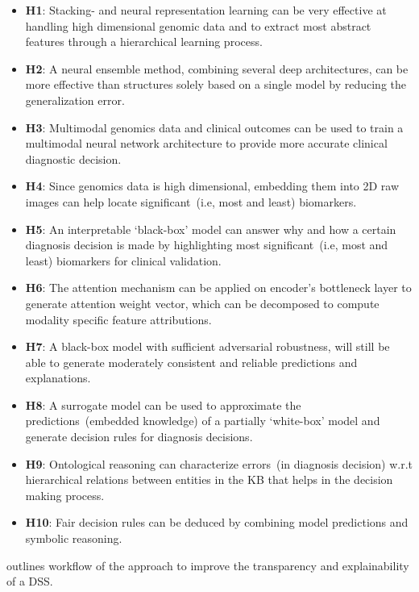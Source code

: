 \begin{itemize}[noitemsep]
    \item \textbf{H1}: Stacking- and neural representation learning can be very effective at handling high dimensional genomic data and to extract most abstract features through a hierarchical learning process. 
    \item \textbf{H2}: A neural ensemble method, combining several deep architectures, can be more effective than structures solely based on a single model by reducing the generalization error. 
	\item \textbf{H3}: Multimodal genomics data and clinical outcomes can be used to train a multimodal neural network architecture to provide more accurate clinical diagnostic decision. 
    \item \textbf{H4}: Since genomics data is high dimensional, embedding them into 2D raw images can help locate significant~(i.e, most and least) biomarkers. 
    \item \textbf{H5}: An interpretable `black-box' model can answer why and how a certain diagnosis decision is made by highlighting most significant~(i.e, most and least) biomarkers for clinical validation. 
    \item \textbf{H6}: The attention mechanism can be applied on encoder's bottleneck layer to generate attention weight vector, which can be decomposed to compute modality specific feature attributions. 
    \item \textbf{H7}: A black-box model with sufficient adversarial robustness, will still be able to generate moderately consistent and reliable predictions and explanations. 
    \item \textbf{H8}: A surrogate model can be used to approximate the predictions~(embedded knowledge) of a partially `white-box' model and generate decision rules for diagnosis decisions. 
    \item \textbf{H9}: Ontological reasoning can characterize errors~(in diagnosis decision) w.r.t hierarchical relations between entities in the KB that helps in the decision making process.
    \item \textbf{H10}: Fair decision rules can be deduced by combining model predictions and symbolic reasoning. 
\end{itemize}

\hspace*{3.5mm}  outlines workflow of the  approach to improve the transparency and explainability of a DSS. 

